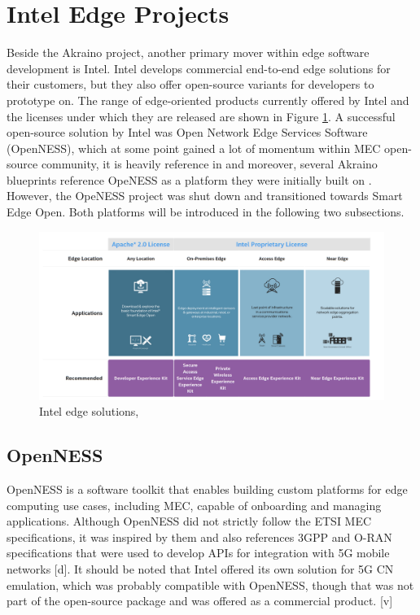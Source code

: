 \documentclass[12pt,a4paper,twoside]{report}
\begin{document}
\section{Intel Edge Projects}
Beside the Akraino project, another primary mover within edge software development is Intel. Intel develops commercial end-to-end edge solutions for their customers, but they also offer open-source variants for developers to prototype on. The range of edge-oriented products currently offered by Intel and the licenses under which they are released are shown in Figure \ref{F:intel-solu}. A successful open-source solution by Intel was Open Network Edge Services Software (OpenNESS), which at some point gained a lot of momentum within MEC open-source community, it is heavily reference in \cite{sabella-mec-sw-dev} and moreover, several Akraino blueprints reference OpeNESS as a platform they were initially built on \cite{cvb-docu,akraino-mec-slice-docu}. However, the OpeNESS project was shut down and transitioned towards Smart Edge Open. Both platforms will be introduced in the following two subsections.
\begin{figure}[ht]
	\centering
	\includegraphics[width=13cm]{./images/intel-solu.png} 
	\caption{Intel edge solutions, \cite{seo-overview}}
	\label{F:intel-solu}
\end{figure}

\subsection{OpenNESS}
OpenNESS is a software toolkit that enables building custom platforms for edge computing use cases, including MEC, capable of onboarding and managing applications. Although OpenNESS did not strictly follow the ETSI MEC specifications, it was inspired by them and also references 3GPP and O-RAN specifications that were used to develop APIs for integration with 5G mobile networks [d]. It should be noted that Intel offered its own solution for 5G CN emulation, which was probably compatible with OpenNESS, though that was not part of the open-source package and was offered as a commercial product. [v] 
\end{document}

